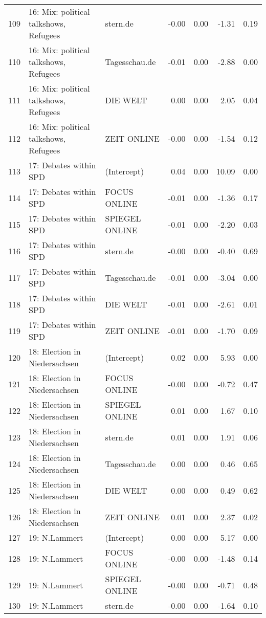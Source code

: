 \begin{table}[ht]
{\begin{tabular}{rllrrrr}
  109 & 16: Mix: political talkshows, Refugees & stern.de & -0.00 & 0.00 & -1.31 & 0.19 \\ 
  110 & 16: Mix: political talkshows, Refugees & Tagesschau.de & -0.01 & 0.00 & -2.88 & 0.00 \\ 
  111 & 16: Mix: political talkshows, Refugees & DIE WELT & 0.00 & 0.00 & 2.05 & 0.04 \\ 
  112 & 16: Mix: political talkshows, Refugees & ZEIT ONLINE & -0.00 & 0.00 & -1.54 & 0.12 \\ 
  113 & 17: Debates within SPD & (Intercept) & 0.04 & 0.00 & 10.09 & 0.00 \\ 
  114 & 17: Debates within SPD & FOCUS ONLINE & -0.01 & 0.00 & -1.36 & 0.17 \\ 
  115 & 17: Debates within SPD & SPIEGEL ONLINE & -0.01 & 0.00 & -2.20 & 0.03 \\ 
  116 & 17: Debates within SPD & stern.de & -0.00 & 0.00 & -0.40 & 0.69 \\ 
  117 & 17: Debates within SPD & Tagesschau.de & -0.01 & 0.00 & -3.04 & 0.00 \\ 
  118 & 17: Debates within SPD & DIE WELT & -0.01 & 0.00 & -2.61 & 0.01 \\ 
  119 & 17: Debates within SPD & ZEIT ONLINE & -0.01 & 0.00 & -1.70 & 0.09 \\ 
  120 & 18: Election in Niedersachsen & (Intercept) & 0.02 & 0.00 & 5.93 & 0.00 \\ 
  121 & 18: Election in Niedersachsen & FOCUS ONLINE & -0.00 & 0.00 & -0.72 & 0.47 \\ 
  122 & 18: Election in Niedersachsen & SPIEGEL ONLINE & 0.01 & 0.00 & 1.67 & 0.10 \\ 
  123 & 18: Election in Niedersachsen & stern.de & 0.01 & 0.00 & 1.91 & 0.06 \\ 
  124 & 18: Election in Niedersachsen & Tagesschau.de & 0.00 & 0.00 & 0.46 & 0.65 \\ 
  125 & 18: Election in Niedersachsen & DIE WELT & 0.00 & 0.00 & 0.49 & 0.62 \\ 
  126 & 18: Election in Niedersachsen & ZEIT ONLINE & 0.01 & 0.00 & 2.37 & 0.02 \\ 
  127 & 19: N.Lammert & (Intercept) & 0.00 & 0.00 & 5.17 & 0.00 \\ 
  128 & 19: N.Lammert & FOCUS ONLINE & -0.00 & 0.00 & -1.48 & 0.14 \\ 
  129 & 19: N.Lammert & SPIEGEL ONLINE & -0.00 & 0.00 & -0.71 & 0.48 \\ 
  130 & 19: N.Lammert & stern.de & -0.00 & 0.00 & -1.64 & 0.10 \\ 

\end{tabular}}
\end{table}
